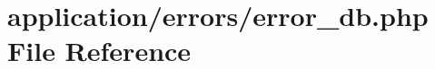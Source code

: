 \hypertarget{error__db_8php}{\section{application/errors/error\-\_\-db.php File Reference}
\label{error__db_8php}
}
